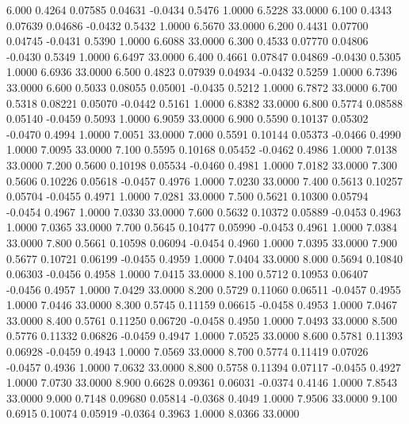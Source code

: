    6.000   0.4264   0.07585   0.04631  -0.0434   0.5476   1.0000   6.5228  33.0000
   6.100   0.4343   0.07639   0.04686  -0.0432   0.5432   1.0000   6.5670  33.0000
   6.200   0.4431   0.07700   0.04745  -0.0431   0.5390   1.0000   6.6088  33.0000
   6.300   0.4533   0.07770   0.04806  -0.0430   0.5349   1.0000   6.6497  33.0000
   6.400   0.4661   0.07847   0.04869  -0.0430   0.5305   1.0000   6.6936  33.0000
   6.500   0.4823   0.07939   0.04934  -0.0432   0.5259   1.0000   6.7396  33.0000
   6.600   0.5033   0.08055   0.05001  -0.0435   0.5212   1.0000   6.7872  33.0000
   6.700   0.5318   0.08221   0.05070  -0.0442   0.5161   1.0000   6.8382  33.0000
   6.800   0.5774   0.08588   0.05140  -0.0459   0.5093   1.0000   6.9059  33.0000
   6.900   0.5590   0.10137   0.05302  -0.0470   0.4994   1.0000   7.0051  33.0000
   7.000   0.5591   0.10144   0.05373  -0.0466   0.4990   1.0000   7.0095  33.0000
   7.100   0.5595   0.10168   0.05452  -0.0462   0.4986   1.0000   7.0138  33.0000
   7.200   0.5600   0.10198   0.05534  -0.0460   0.4981   1.0000   7.0182  33.0000
   7.300   0.5606   0.10226   0.05618  -0.0457   0.4976   1.0000   7.0230  33.0000
   7.400   0.5613   0.10257   0.05704  -0.0455   0.4971   1.0000   7.0281  33.0000
   7.500   0.5621   0.10300   0.05794  -0.0454   0.4967   1.0000   7.0330  33.0000
   7.600   0.5632   0.10372   0.05889  -0.0453   0.4963   1.0000   7.0365  33.0000
   7.700   0.5645   0.10477   0.05990  -0.0453   0.4961   1.0000   7.0384  33.0000
   7.800   0.5661   0.10598   0.06094  -0.0454   0.4960   1.0000   7.0395  33.0000
   7.900   0.5677   0.10721   0.06199  -0.0455   0.4959   1.0000   7.0404  33.0000
   8.000   0.5694   0.10840   0.06303  -0.0456   0.4958   1.0000   7.0415  33.0000
   8.100   0.5712   0.10953   0.06407  -0.0456   0.4957   1.0000   7.0429  33.0000
   8.200   0.5729   0.11060   0.06511  -0.0457   0.4955   1.0000   7.0446  33.0000
   8.300   0.5745   0.11159   0.06615  -0.0458   0.4953   1.0000   7.0467  33.0000
   8.400   0.5761   0.11250   0.06720  -0.0458   0.4950   1.0000   7.0493  33.0000
   8.500   0.5776   0.11332   0.06826  -0.0459   0.4947   1.0000   7.0525  33.0000
   8.600   0.5781   0.11393   0.06928  -0.0459   0.4943   1.0000   7.0569  33.0000
   8.700   0.5774   0.11419   0.07026  -0.0457   0.4936   1.0000   7.0632  33.0000
   8.800   0.5758   0.11394   0.07117  -0.0455   0.4927   1.0000   7.0730  33.0000
   8.900   0.6628   0.09361   0.06031  -0.0374   0.4146   1.0000   7.8543  33.0000
   9.000   0.7148   0.09680   0.05814  -0.0368   0.4049   1.0000   7.9506  33.0000
   9.100   0.6915   0.10074   0.05919  -0.0364   0.3963   1.0000   8.0366  33.0000
